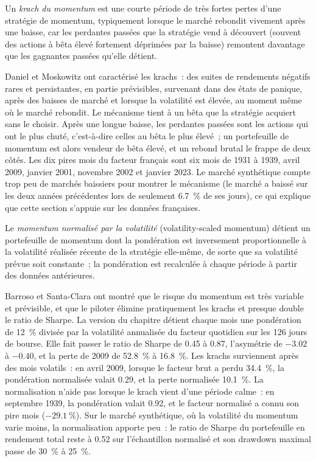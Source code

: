 \begin{definition}\label{def:s1:momentum:crash}
Un \emph{krach du momentum} est une courte période de très fortes pertes d'une stratégie de momentum, typiquement lorsque le marché rebondit vivement après
une baisse, car les perdantes passées que la stratégie vend à découvert (souvent des actions à bêta élevé fortement déprimées par la baisse) remontent davantage que les gagnantes passées qu'elle détient.
\end{definition}

Daniel et Moskowitz ont caractérisé les krachs~: des suites de rendements négatifs rares et persistantes, en partie prévisibles, survenant dans des états de panique,
après des baisses de marché et lorsque la volatilité est élevée, au moment même où le marché rebondit. Le mécanisme tient à un bêta que la stratégie acquiert sans
le choisir. Après une longue baisse, les perdantes passées sont les actions qui ont le plus chuté, c'est-à-dire celles au bêta le plus élevé~; un portefeuille de momentum est alors vendeur de bêta élevé,
et un rebond brutal le frappe de deux côtés. Les dix pires mois du facteur français sont six mois de 1931 à 1939, avril 2009, janvier 2001, novembre 2002 et
janvier 2023. Le marché synthétique compte trop peu de marchés baissiers pour montrer le mécanisme (le marché a baissé sur les deux années précédentes lors de seulement 6.7~\% de ses jours),
ce qui explique que cette section s'appuie sur les données françaises.

\begin{definition}\label{def:s1:momentum:scaled}
Le \emph{momentum normalisé par la volatilité} (volatility-scaled momentum) détient un portefeuille de momentum dont la pondération est inversement proportionnelle à la volatilité réalisée récente de la stratégie elle-même,
de sorte que sa volatilité prévue soit constante~; la pondération est recalculée à chaque période à partir des données antérieures.
\end{definition}

Barroso et Santa-Clara ont montré que le risque du momentum est très variable et prévisible, et que le piloter élimine pratiquement les krachs et presque
double le ratio de Sharpe. La version du chapitre détient chaque mois une pondération de 12~\% divisée par la volatilité annualisée du facteur quotidien sur les 126
jours de bourse. Elle fait passer le ratio de Sharpe de 0.45 à 0.87, l'asymétrie de $-3.02$ à $-0.40$, et la perte de 2009 de 52.8~\% à 16.8~\%. Les krachs
surviennent après des mois volatils~: en avril 2009, lorsque le facteur brut a perdu 34.4~\%, la pondération normalisée valait 0.29, et la perte normalisée 10.1~\%. La normalisation n'aide pas
lorsque le krach vient d'une période calme~: en septembre 1939, la pondération valait 0.92, et le facteur normalisé a connu son pire mois ($-29.1~\%$). Sur le marché synthétique,
où la volatilité du momentum varie moins, la normalisation apporte peu~: le ratio de Sharpe du portefeuille en rendement total reste à 0.52 sur l'échantillon normalisé et son
drawdown maximal passe de 30~\% à 25~\%.

